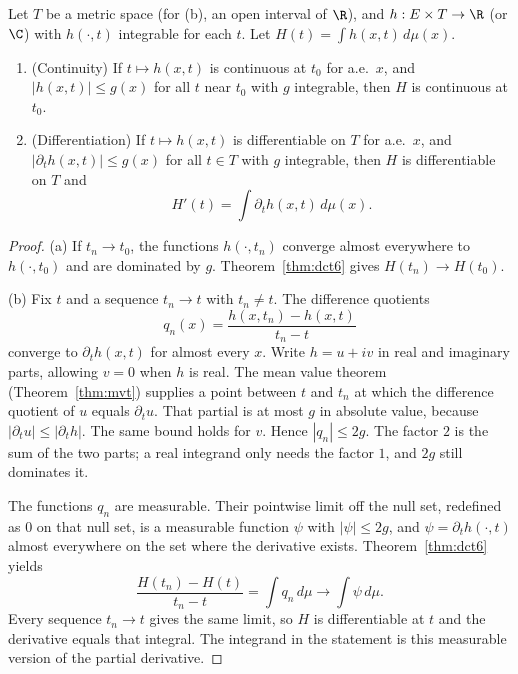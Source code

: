 \begin{theorem}\label{thm:parameter}
Let \(T\) be a metric space (for (b), an open interval of \(\R\)), and \(h:E\times T\to\R\) (or \(\C\)) with \(h(\cdot,t)\) integrable for each \(t\). Let \(H(t)=\int h(x,t)\,d\mu(x)\).
\begin{enumerate}[label=(\alph*)]
\item (Continuity) If \(t\mapsto h(x,t)\) is continuous at \(t_0\) for a.e.\ \(x\), and \(|h(x,t)|\le g(x)\) for all \(t\) near \(t_0\) with \(g\) integrable, then \(H\) is continuous at \(t_0\).
\item (Differentiation) If \(t\mapsto h(x,t)\) is differentiable on \(T\) for a.e.\ \(x\), and \(|\partial_th(x,t)|\le g(x)\) for all \(t\in T\) with \(g\) integrable, then \(H\) is differentiable on \(T\) and
\[H'(t)=\int\partial_th(x,t)\,d\mu(x).\]
\end{enumerate}
\end{theorem}
\begin{proof}
(a) If \(t_n\to t_0\), the functions \(h(\cdot,t_n)\) converge almost everywhere to \(h(\cdot,t_0)\) and are dominated by \(g\). Theorem~\ref{thm:dct6} gives \(H(t_n)\to H(t_0)\).

(b) Fix \(t\) and a sequence \(t_n\to t\) with \(t_n\ne t\). The difference quotients
\[
q_n(x)=\frac{h(x,t_n)-h(x,t)}{t_n-t}
\]
converge to \(\partial_th(x,t)\) for almost every \(x\). Write \(h=u+iv\) in real and imaginary parts, allowing \(v=0\) when \(h\) is real. The mean value theorem (Theorem~\ref{thm:mvt}) supplies a point between \(t\) and \(t_n\) at which the difference quotient of \(u\) equals \(\partial_tu\). That partial is at most \(g\) in absolute value, because \(|\partial_tu|\le|\partial_th|\). The same bound holds for \(v\). Hence \(|q_n|\le2g\). The factor \(2\) is the sum of the two parts; a real integrand only needs the factor \(1\), and \(2g\) still dominates it.

The functions \(q_n\) are measurable. Their pointwise limit off the null set, redefined as \(0\) on that null set, is a measurable function \(\psi\) with \(|\psi|\le2g\), and \(\psi=\partial_th(\cdot,t)\) almost everywhere on the set where the derivative exists. Theorem~\ref{thm:dct6} yields
\[
\frac{H(t_n)-H(t)}{t_n-t}=\int q_n\,d\mu\to\int\psi\,d\mu.
\]
Every sequence \(t_n\to t\) gives the same limit, so \(H\) is differentiable at \(t\) and the derivative equals that integral. The integrand in the statement is this measurable version of the partial derivative.
\end{proof}

